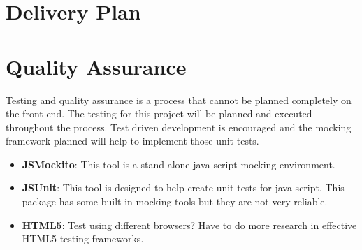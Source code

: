 \documentclass[12pt, letterpaper]{article}
\begin{document}
\section{Delivery Plan}

\section{Quality Assurance}
    Testing and quality assurance is a process that cannot be planned completely
    on the front end. The testing for this project will be planned and executed
    throughout the process. Test driven development is encouraged and the
    mocking framework planned will help to implement those unit tests.
\begin{itemize}
    \item {\bf JSMockito}: This tool is a stand-alone java-script mocking
    environment. 
    \item {\bf JSUnit}: This tool is designed to help create unit tests for
    java-script. This package has some built in mocking tools but they are not
    very reliable.
    \item {\bf HTML5}: Test using different browsers? Have to do more research
    in effective HTML5 testing frameworks.
\end{itemize}
\end{document}

